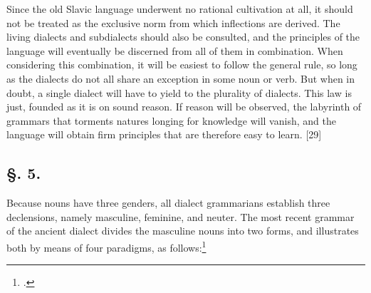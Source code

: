 Since the old Slavic language underwent no rational cultivation at all, it should not be treated as the exclusive norm from which inflections are derived. The living dialects and subdialects should also be consulted, and the principles of the language will eventually be discerned from all of them in combination. When considering this combination, it will be easiest to follow the general rule, so long as the dialects do not all share an exception in some noun or verb. But when in doubt, a single dialect will have to yield to the plurality of dialects. This law is just, founded as it is on sound reason. If reason will be observed, the labyrinth of grammars that torments natures longing for knowledge will vanish, and the language will obtain firm principles that are therefore easy to learn. [29]

\subsection*{\hspace*{\fill}§. 5.\hspace*{\fill}}

Because nouns have three genders, all dialect grammarians establish three declensions, namely masculine, feminine, and neuter. The most recent grammar of the ancient dialect divides the masculine nouns into two forms, and illustrates both by means of four paradigms, as follows:\footnote{\citet[466, 468]{dobrovsky_institutiones_1822}.}

